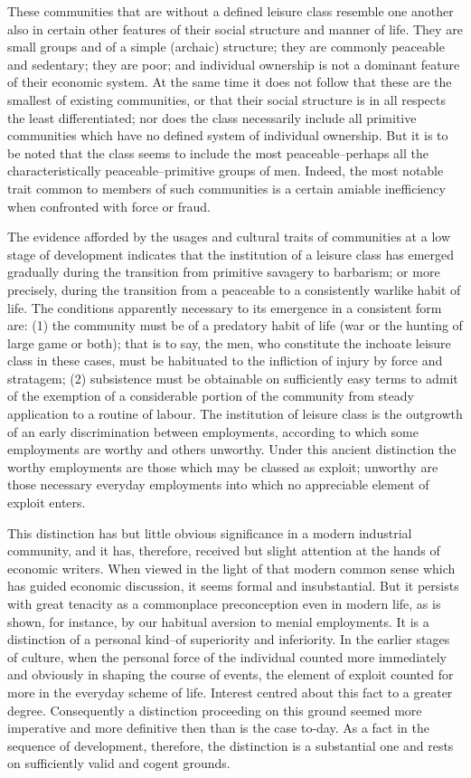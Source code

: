 \documentclass[12pt]{report}
\begin{document}
These communities that are without a defined leisure class resemble one
another also in certain other features of their social structure
and manner of life. They are small groups and of a simple (archaic)
structure; they are commonly peaceable and sedentary; they are poor; and
individual ownership is not a dominant feature of their economic system.
At the same time it does not follow that these are the smallest of
existing communities, or that their social structure is in all respects
the least differentiated; nor does the class necessarily include
all primitive communities which have no defined system of individual
ownership. But it is to be noted that the class seems to include the
most peaceable--perhaps all the characteristically peaceable--primitive
groups of men. Indeed, the most notable trait common to members of such
communities is a certain amiable inefficiency when confronted with force
or fraud.

The evidence afforded by the usages and cultural traits of communities
at a low stage of development indicates that the institution of a
leisure class has emerged gradually during the transition from primitive
savagery to barbarism; or more precisely, during the transition from
a peaceable to a consistently warlike habit of life. The conditions
apparently necessary to its emergence in a consistent form are: (1) the
community must be of a predatory habit of life (war or the hunting
of large game or both); that is to say, the men, who constitute the
inchoate leisure class in these cases, must be habituated to the
infliction of injury by force and stratagem; (2) subsistence must be
obtainable on sufficiently easy terms to admit of the exemption of
a considerable portion of the community from steady application to a
routine of labour. The institution of leisure class is the outgrowth
of an early discrimination between employments, according to which
some employments are worthy and others unworthy. Under this ancient
distinction the worthy employments are those which may be classed as
exploit; unworthy are those necessary everyday employments into which no
appreciable element of exploit enters.

This distinction has but little obvious significance in a modern
industrial community, and it has, therefore, received but slight
attention at the hands of economic writers. When viewed in the light of
that modern common sense which has guided economic discussion, it seems
formal and insubstantial. But it persists with great tenacity as
a commonplace preconception even in modern life, as is shown, for
instance, by our habitual aversion to menial employments. It is a
distinction of a personal kind--of superiority and inferiority. In the
earlier stages of culture, when the personal force of the individual
counted more immediately and obviously in shaping the course of events,
the element of exploit counted for more in the everyday scheme of life.
Interest centred about this fact to a greater degree. Consequently a
distinction proceeding on this ground seemed more imperative and more
definitive then than is the case to-day. As a fact in the sequence of
development, therefore, the distinction is a substantial one and rests
on sufficiently valid and cogent grounds.
\end{document}

